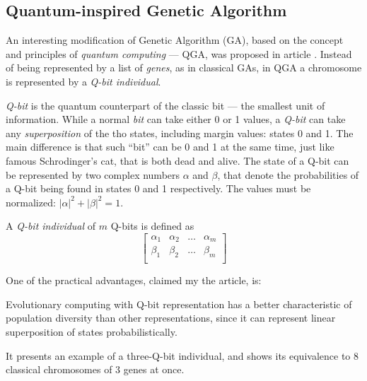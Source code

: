 \documentclass[../header]{subfiles}
\begin{document}
\providecommand{\rootdir}{..}



\subsection{Quantum-inspired Genetic Algorithm}
An interesting modification of Genetic Algorithm (GA), based on the concept and
principles of \emph{quantum computing} --- QGA, was proposed in article
\cite{QuantumGeneticAlgorithm}.
Instead of being represented by a list of \emph{genes}, as in classical GAs,
in QGA a chromosome is represented by a \emph{Q-bit individual}.

\emph{Q-bit} is the quantum counterpart of the classic bit --- the smallest
unit of information. While a normal \emph{bit} can take either 0 or 1 values,
a \emph{Q-bit} can take any \emph{superposition} of the tho states, including
margin values: states 0 and 1. The main difference is that such ``bit'' can be
0 and 1 at the same time, just like famous Schrodinger's cat, that is both dead
and alive. The state of a Q-bit can be represented by two complex numbers
$\alpha$ and $\beta$, that denote the probabilities of a Q-bit being found in
states 0 and 1 respectively.
The values must be normalized: $|\alpha|^2 + |\beta|^2 = 1$.

A \emph{Q-bit individual} of $m$ Q-bits is defined as
\begin{equation}
\left[
  \begin{array}{cccc}
  \alpha_1 & \alpha_2 & \dots & \alpha_m \\
  \beta_1  & \beta_2  & \dots & \beta_m  \\
  \end{array}
\right]
\end{equation}

One of the practical advantages, claimed my the article, is:
\begin{displayquote}
  Evolutionary computing with Q­-bit representation has a better characteristic
  of population diversity than other representations, since it can represent
  linear superposition of states probabilistically.
\end{displayquote}
It presents an example of a three-Q-bit individual, and shows its equivalence
to 8 classical chromosomes of 3 genes at once.
\end{document}
